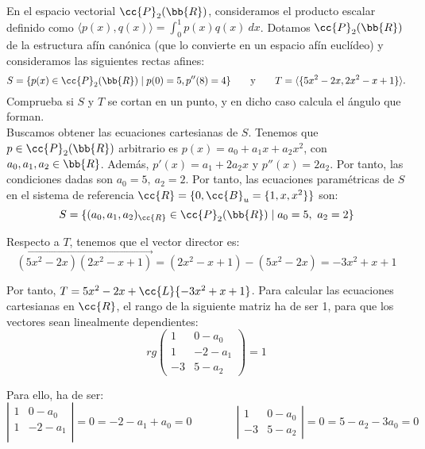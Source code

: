 \begin{ejercicio}
    En el espacio vectorial $\cc{P}_2(\bb{R})$, consideramos el producto escalar definido como $\langle p(x), q(x)\rangle = \int_0^1 p(x)q(x)~dx$.
    Dotamos $\cc{P}_2(\bb{R})$ de la estructura afín canónica (que lo convierte en un espacio afín euclídeo) y consideramos las siguientes rectas afines:
    \begin{equation*}
        S = \{p(x) \in \cc{P}_2(\bb{R}) \mid p(0) = 5, p''(8) = 4\}
        \qquad \text{y} \qquad
        T = \langle\{5x^2 - 2x, 2x^2 - x + 1\}\rangle.
    \end{equation*} 
    Comprueba si $S$ y $T$ se cortan en un punto, y en dicho caso calcula el ángulo que forman.\\

    Buscamos obtener las ecuaciones cartesianas de $S$. Tenemos que $p\in \cc{P}_2(\bb{R})$ arbitrario es $p(x)=a_0+a_1x+a_2x^2$, con $a_0,a_1,a_2\in \bb{R}$. Además, $p'(x)=a_1+2a_2x$ y $p''(x)=2a_2$. Por tanto, las condiciones dadas son $a_0=5,~ a_2=2$. Por tanto, las ecuaciones paramétricas de $S$ en el sistema de referencia $\cc{R}=\{0,\cc{B}_u=\{1,x,x^2\}\}$ son:
    \begin{equation*}
        S = \{(a_0,a_1,a_2)_{\cc{R}}\in \cc{P}_2(\bb{R})\mid a_0=5,~a_2=2\}
    \end{equation*}

    Respecto a $T$, tenemos que el vector director es:
    $$\vec{(5x^2-2x)(2x^2-x+1)} = (2x^2-x+1) - (5x^2-2x) = -3x^2+x+1$$

    Por tanto, $T=5x^2-2x + \cc{L}\{-3x^2+x+1\}$. Para calcular las ecuaciones cartesianas en $\cc{R}$, el rango de la siguiente matriz ha de ser 1, para que
    los vectores sean linealmente dependientes:
    \begin{equation*}
        rg\left(
            \begin{array}{cc}
                1 & 0-a_0 \\
                1 & -2-a_1\\
                -3 & 5-a_2
            \end{array}
        \right) = 1
    \end{equation*}

    Para ello, ha de ser:
    \begin{equation*}
        \left|
            \begin{array}{cc}
                1 & 0-a_0 \\
                1 & -2-a_1\\
            \end{array}
        \right| = 0 = -2-a_1 + a_0 = 0
        \qquad \qquad
        \left|
            \begin{array}{cc}
                1 & 0-a_0 \\
                -3 & 5-a_2
            \end{array}
        \right| = 0 = 5-a_2-3a_0 = 0
    \end{equation*}


\end{ejercicio}
